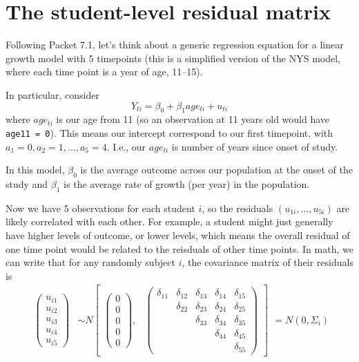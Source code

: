 \documentclass[
  letterpaper,
  DIV=11,
  numbers=noendperiod]{scrreprt}
\begin{document}
\section{The student-level residual
matrix}\label{the-student-level-residual-matrix}

Following Packet 7.1, let's think about a generic regression equation
for a linear growth model with 5 timepoints (this is a simplified
version of the NYS model, where each time point is a year of age,
11--15).

In particular, consider \[
Y_{ti} = \beta_0 + \beta_1 age_{ti} + u_{ti}
\] where \(age_{ti}\) is our age from 11 (so an observation at 11 years
old would have \texttt{age11\ =\ 0}). This means our intercept
correspond to our first timepoint, with
\(a_1 = 0, a_2 = 1, ..., a_5 = 4\). I.e., our \(age_{ti}\) is number of
years since onset of study.

In this model, \(\beta_{0}\) is the average outcome across our
population at the onset of the study and \(\beta_{1}\) is the average
rate of growth (per year) in the population.

Now we have 5 observations for each student \(i\), so the residuals
\((u_{1i}, \ldots, u_{5i})\) are likely correlated with each other. For
example, a student might just generally have higher levels of outcome,
or lower levels, which means the overall residual of one time point
would be related to the reisduals of other time points. In math, we can
write that for any randomly subject \(i\), the covariance matrix of
their residuals is \[\begin{aligned}
\begin{pmatrix} u_{i1} \\
u_{i2} \\
u_{i3} \\
u_{i4} \\
u_{i5}
\end{pmatrix} &\sim  N
\begin{bmatrix}
\begin{pmatrix}
0 \\
0 \\
0\\
0 \\
0
\end{pmatrix}\!\!,&
\begin{pmatrix}
\delta_{11} & \delta_{12} & \delta_{13} & \delta_{14} & \delta_{15} \\
           & \delta_{22} & \delta_{23} & \delta_{24} & \delta_{25} \\
         &              & \delta_{33} & \delta_{34} & \delta_{35} \\
         &              &             & \delta_{44} & \delta_{45} \\
         &              &              &            & \delta_{55} 
\end{pmatrix}
\end{bmatrix}
\end{aligned} = N( 0, \Sigma_i)\]
\end{document}
